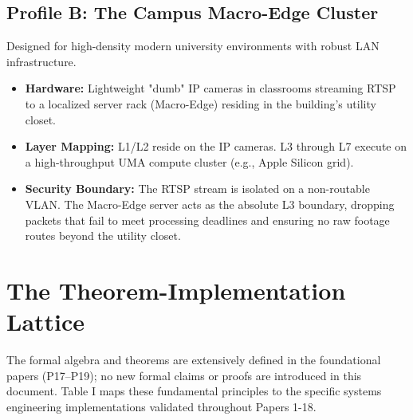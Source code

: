 \documentclass[conference]{IEEEtran}
\begin{document}
\subsection{Profile B: The Campus Macro-Edge Cluster}
Designed for high-density modern university environments with robust LAN infrastructure.
\begin{itemize}
    \item \textbf{Hardware:} Lightweight "dumb" IP cameras in classrooms streaming RTSP to a localized server rack (Macro-Edge) residing in the building's utility closet.
    \item \textbf{Layer Mapping:} L1/L2 reside on the IP cameras. L3 through L7 execute on a high-throughput UMA compute cluster (e.g., Apple Silicon grid). 
    \item \textbf{Security Boundary:} The RTSP stream is isolated on a non-routable VLAN. The Macro-Edge server acts as the absolute L3 boundary, dropping packets that fail to meet processing deadlines and ensuring no raw footage routes beyond the utility closet.
\end{itemize}

\section{The Theorem-Implementation Lattice}
The formal algebra and theorems are extensively defined in the foundational papers (P17–P19); no new formal claims or proofs are introduced in this document. Table I maps these fundamental principles to the specific systems engineering implementations validated throughout Papers 1-18.
\end{document}
